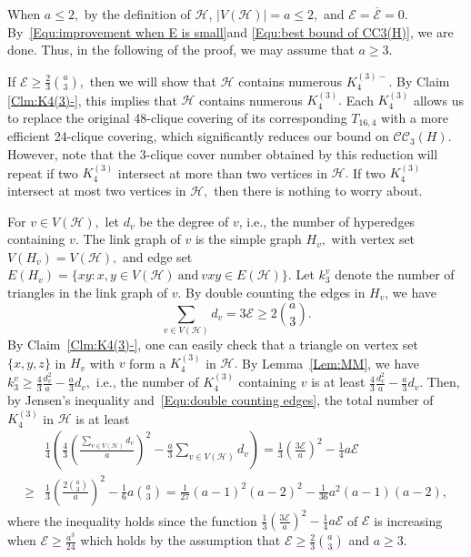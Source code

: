 \documentclass[11pt,a4paper]{article}
\newcommand{\dH}{{\mathcal{H}}}
\newcommand{\dE}{{\mathcal{E}}}
\newcommand{\turangraph}[2]{T_{#1,#2}}
\newcommand{\coveropt}[2]{{\mathcal{C}\mathcal{C}_{#1}(#2)}}
\begin{document}
When $a\le 2,$ by the definition of $\dH$, $|V(\dH)|=a\le2,$ and 
$\dE=\overline{\dE}=0$.
By~\eqref{Equ:improvement when E is small}and \eqref{Equ:best bound of CC3(H)}, we are done.
Thus, in the following of the proof, we may assume that $a\ge 3.$

If $\dE \ge \frac{2}{3} \binom{a}{3},$
then we will show that $\mathcal{H}$ contains numerous $K_4^{(3)-}.$
By Claim \ref{Clm:K4(3)-}, this implies that $\mathcal{H}$ contains numerous $K_4^{(3)}.$ 
Each $K_4^{(3)}$ allows us to replace the original 48-clique covering of its corresponding $\turangraph{16}{4}$ with a more efficient 24-clique covering, which significantly reduces our bound on $\coveropt{3}{H}$.
However, note that the $3$-clique cover number obtained by this reduction will repeat if two $K_4^{(3)}$ intersect at more than two vertices in $\dH.$
If two $K_4^{(3)}$ intersect at most two vertices in $\dH,$
then there is nothing to worry about.

For $v\in V(\mathcal{H}),$ let $d_v$ be the degree of $v$, i.e., the number of hyperedges containing $v.$ 
The link graph of $v$ is the simple graph $H_v,$
with vertex set $V(H_v)=V(\mathcal{H}),$
and edge set 
$E(H_v)=\{xy:x,y\in V(\dH)\ \text{and}\ vxy\in E(\mathcal{H})\}.$
Let $k_3^v$ denote the number of triangles in the link graph of $v.$
By double counting the edges in $H_v$, we have
\begin{equation}\label{Equ:double counting edges}
\sum_{v\in V(\mathcal{H})} d_v = 3  \dE \geq 2 \binom{a}{3}.
\end{equation}
By Claim~\ref{Clm:K4(3)-}, 
one can easily check that a triangle on vertex set $\{x,y,z\}$ in $H_v$ with $v$ form a $K_4^{(3)}$ in $\dH.$
By Lemma~\ref{Lem:MM}, 
we have
$k_3^v\geq \frac{4}{3} \frac{d_v^2}{a} -\frac{a}{3} d_v,$ i.e., 
the number of $K_4^{(3)}$ containing $v$ is at least $\frac{4}{3} \frac{d_v^2}{a} -\frac{a}{3}d_v.$
Then, by Jensen's inequality and~\eqref{Equ:double counting edges}, the total number of  $K_4^{(3)}$ in $\dH$ is at least
\begin{align*}
&\frac{1}{4}\left(\frac{4}{3} 
\left( \frac{\sum_{v \in V(\mathcal{H})} d_v}{a} \right)^2
- \frac a 3\sum_{v \in V(\mathcal{H})} d_v \right)
=\frac 13 \left( \frac{3\dE}{a} \right)^2 - \frac 1 4 a \dE\\
\ge& \frac 1 3\left(\frac{2 \binom{a}{3}}{a} \right)^2
- \frac{1}{6} a \binom{a}{3}
=\frac{1}{27}(a-1)^2(a-2)^2-\frac{1}{36}a^2(a-1)(a-2),
\end{align*}
where the inequality holds since the function $\frac 13 \left( \frac{3\dE}{a} \right)^2 - \frac 1 4 a \dE$ of $\dE$ is increasing when $\dE \geq \frac{a^3}{24}$
which holds by the assumption that $\dE \ge \frac{2}{3} \binom{a}{3}$ and $a\ge 3.$
\end{document}

